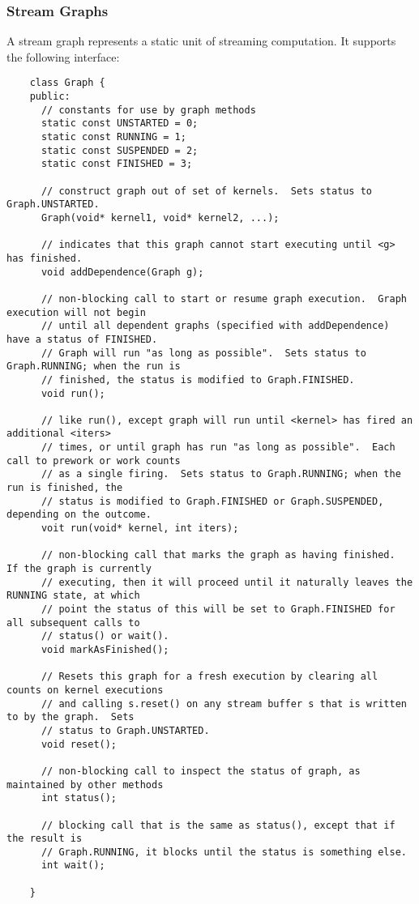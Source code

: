 \subsubsection{Stream Graphs}
\label{sec:streamgraph}

A stream graph represents a static unit of streaming computation.  It
supports the following interface:
{\small
\begin{verbatim}
    class Graph {
    public:
      // constants for use by graph methods
      static const UNSTARTED = 0;
      static const RUNNING = 1;
      static const SUSPENDED = 2;
      static const FINISHED = 3;

      // construct graph out of set of kernels.  Sets status to Graph.UNSTARTED.
      Graph(void* kernel1, void* kernel2, ...);

      // indicates that this graph cannot start executing until <g> has finished.
      void addDependence(Graph g);

      // non-blocking call to start or resume graph execution.  Graph execution will not begin
      // until all dependent graphs (specified with addDependence) have a status of FINISHED.
      // Graph will run "as long as possible".  Sets status to Graph.RUNNING; when the run is
      // finished, the status is modified to Graph.FINISHED.
      void run();
      
      // like run(), except graph will run until <kernel> has fired an additional <iters>
      // times, or until graph has run "as long as possible".  Each call to prework or work counts
      // as a single firing.  Sets status to Graph.RUNNING; when the run is finished, the
      // status is modified to Graph.FINISHED or Graph.SUSPENDED, depending on the outcome.
      voit run(void* kernel, int iters);

      // non-blocking call that marks the graph as having finished.  If the graph is currently
      // executing, then it will proceed until it naturally leaves the RUNNING state, at which
      // point the status of this will be set to Graph.FINISHED for all subsequent calls to
      // status() or wait().
      void markAsFinished();

      // Resets this graph for a fresh execution by clearing all counts on kernel executions
      // and calling s.reset() on any stream buffer s that is written to by the graph.  Sets
      // status to Graph.UNSTARTED.
      void reset();      

      // non-blocking call to inspect the status of graph, as maintained by other methods
      int status();

      // blocking call that is the same as status(), except that if the result is
      // Graph.RUNNING, it blocks until the status is something else.
      int wait();

    }
\end{verbatim}}

